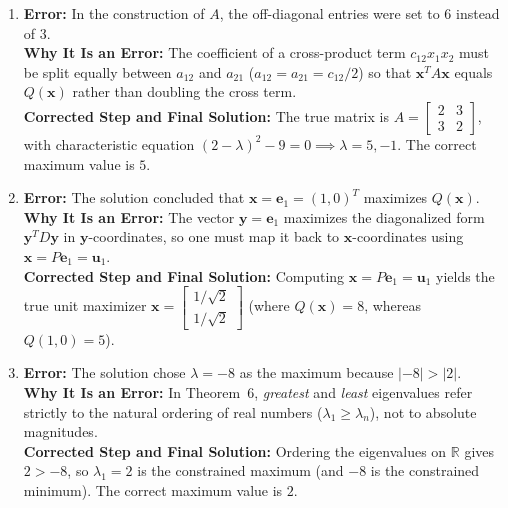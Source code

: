 \documentclass[11pt, letterpaper]{article}
\theoremstyle{definition}
\theoremstyle{remark}
\newcommand{\R}{\mathbb{R}}
\begin{document}
\begin{enumerate}[label=\textbf{Key \arabic*:}]
    \item \textbf{Error:} In the construction of $A$, the off-diagonal entries were set to $6$ instead of $3$.\\
    \textbf{Why It Is an Error:} The coefficient of a cross-product term $c_{12} x_1 x_2$ must be split equally between $a_{12}$ and $a_{21}$ ($a_{12} = a_{21} = c_{12}/2$) so that $\mathbf{x}^T A \mathbf{x}$ equals $Q(\mathbf{x})$ rather than doubling the cross term.\\
    \textbf{Corrected Step and Final Solution:} The true matrix is $A = \begin{bmatrix} 2 & 3 \\ 3 & 2 \end{bmatrix}$, with characteristic equation $(2-\lambda)^2 - 9 = 0 \implies \lambda = 5, -1$. The correct maximum value is $5$.

    \item \textbf{Error:} The solution concluded that $\mathbf{x} = \mathbf{e}_1 = (1, 0)^T$ maximizes $Q(\mathbf{x})$.\\
    \textbf{Why It Is an Error:} The vector $\mathbf{y} = \mathbf{e}_1$ maximizes the diagonalized form $\mathbf{y}^T D \mathbf{y}$ in $\mathbf{y}$-coordinates, so one must map it back to $\mathbf{x}$-coordinates using $\mathbf{x} = P\mathbf{e}_1 = \mathbf{u}_1$.\\
    \textbf{Corrected Step and Final Solution:} Computing $\mathbf{x} = P\mathbf{e}_1 = \mathbf{u}_1$ yields the true unit maximizer $\mathbf{x} = \begin{bmatrix} 1/\sqrt{2} \\ 1/\sqrt{2} \end{bmatrix}$ (where $Q(\mathbf{x}) = 8$, whereas $Q(1,0) = 5$).

    \item \textbf{Error:} The solution chose $\lambda = -8$ as the maximum because $|-8| > |2|$.\\
    \textbf{Why It Is an Error:} In Theorem~6, \emph{greatest} and \emph{least} eigenvalues refer strictly to the natural ordering of real numbers ($\lambda_1 \ge \lambda_n$), not to absolute magnitudes.\\
    \textbf{Corrected Step and Final Solution:} Ordering the eigenvalues on $\R$ gives $2 > -8$, so $\lambda_1 = 2$ is the constrained maximum (and $-8$ is the constrained minimum). The correct maximum value is $2$.


\end{enumerate}
\end{document}

